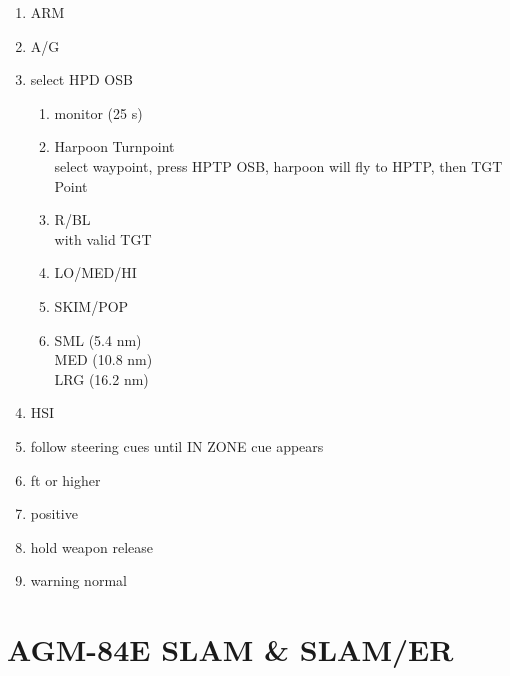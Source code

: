 \documentclass[fontHelvetica, widesubsec]{TechCheck}
\begin{document}
	\begin{enumerate}
		\item {}\dotfill ARM
		\item {}\dotfill A/G
		\item {}\dotfill select HPD OSB
		\begin{enumerate}
			\item {}\dotfill monitor (25 s)
			\item {}\dotfill Harpoon Turnpoint \\ select waypoint, press HPTP OSB, harpoon will fly to HPTP, then TGT Point
			\item {}\dotfill R/BL \\ with valid TGT
			\item {}\dotfill LO/MED/HI
			\item {}\dotfill SKIM/POP
			\item {}\dotfill SML (5.4 nm) \\ \hfill MED (10.8 nm) \\ \hfill LRG (16.2 nm)
		\end{enumerate}
		\item {}\dotfill HSI
		\item {}\dotfill follow steering cues until IN ZONE cue appears
		\item {} ft or higher
		\item {}\dotfill positive
		\item {}\dotfill hold weapon release
		\item {}\dotfill warning normal
	\end{enumerate}

	\thumbnar

	\section{AGM-84E SLAM \& SLAM/ER}
\end{document}
